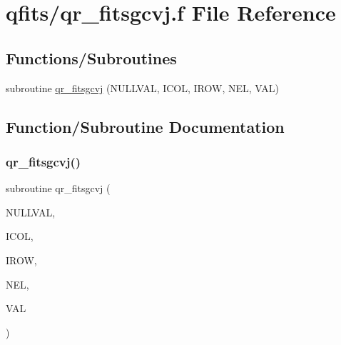 \hypertarget{qr__fitsgcvj_8f}{}\section{qfits/qr\+\_\+fitsgcvj.f File Reference}
\label{qr__fitsgcvj_8f}
\subsection*{Functions/\+Subroutines}
\begin{DoxyCompactItemize}
\item 
subroutine \hyperlink{qr__fitsgcvj_8f_a94eeae5e04cf929a969a72768cca8f61}{qr\+\_\+fitsgcvj} (N\+U\+L\+L\+V\+AL, I\+C\+OL, I\+R\+OW, N\+EL, V\+AL)
\end{DoxyCompactItemize}


\subsection{Function/\+Subroutine Documentation}
\mbox{\label{qr__fitsgcvj_8f_a94eeae5e04cf929a969a72768cca8f61}} 
\subsubsection{\texorpdfstring{qr\+\_\+fitsgcvj()}{qr\_fitsgcvj()}}
{\footnotesize\ttfamily subroutine qr\+\_\+fitsgcvj (\begin{DoxyParamCaption}\item[{integer}]{N\+U\+L\+L\+V\+AL,  }\item[{integer}]{I\+C\+OL,  }\item[{integer}]{I\+R\+OW,  }\item[{integer}]{N\+EL,  }\item[{integer, dimension(nel)}]{V\+AL }\end{DoxyParamCaption})}

